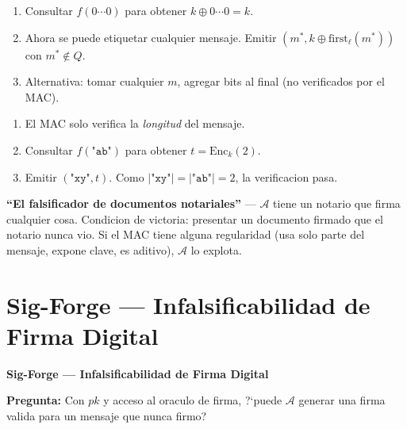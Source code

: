 \documentclass[a4paper,11pt]{article}
\begin{document}
\begin{attackbox}[title={Patron de Ataque -- MAC 2: $\mathrm{Mac}_k(m) = k \oplus \text{first}_\ell(m)$}]
\begin{enumerate}[leftmargin=*, label=\textbf{\arabic*.}]
  \item Consultar $f(0\cdots0)$ para obtener $k \oplus 0\cdots0 = k$.
  \item Ahora se puede etiquetar cualquier mensaje. Emitir $(m^*, k \oplus \text{first}_\ell(m^*))$ con $m^* \notin Q$.
  \item Alternativa: tomar cualquier $m$, agregar bits al final (no verificados por el MAC).
\end{enumerate}
\end{attackbox}

\vspace{0.3cm}

\begin{attackbox}[title={Patron de Ataque -- MAC 3: $\mathrm{Mac}_k(m) = \mathrm{Enc}_k(|m|)$}]
\begin{enumerate}[leftmargin=*, label=\textbf{\arabic*.}]
  \item El MAC solo verifica la \emph{longitud} del mensaje.
  \item Consultar $f(\texttt{"ab"})$ para obtener $t = \mathrm{Enc}_k(2)$.
  \item Emitir $(\texttt{"xy"}, t)$. Como $|\texttt{"xy"}| = |\texttt{"ab"}| = 2$, la verificacion pasa. \checkmark
\end{enumerate}
\end{attackbox}

\begin{hookbox}
\textbf{``El falsificador de documentos notariales''} --- $\mathcal{A}$ tiene un notario que firma cualquier cosa. Condicion de victoria: presentar un documento firmado que el notario nunca vio. Si el MAC tiene alguna regularidad (usa solo parte del mensaje, expone clave, es aditivo), $\mathcal{A}$ lo explota.
\end{hookbox}

\section{Sig-Forge --- Infalsificabilidad de Firma Digital}

\begin{tcolorbox}[
  enhanced, breakable,
  colback=white, colframe=darkBg,
  borderline west={3pt}{0pt}{darkBg},
  sharp corners, drop shadow,
  top=4mm, left=4mm, right=4mm, bottom=4mm,
]
{\color{darkBg}\large\bfseries Sig-Forge --- Infalsificabilidad de Firma Digital}\par\vspace{4pt}
\textbf{Pregunta:} Con $pk$ y acceso al oraculo de firma, ?`puede $\mathcal{A}$ generar una firma valida para un mensaje que nunca firmo?
\end{tcolorbox}
\end{document}
